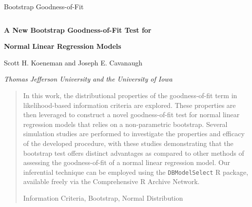 \documentclass[12pt]{article} %
\theoremstyle{definition}
\begin{document}


\renewcommand{\baselinestretch}{2}


{\hfill {\footnotesize\rm Bootstrap Goodness-of-Fit} \hfill}

\renewcommand{\thefootnote}{}
$\ $\par


\fontsize{12}{14pt plus.8pt minus .6pt}\selectfont \vspace{0.8pc}
\centerline{\large\bf A New Bootstrap Goodness-of-Fit Test for}
\vspace{2pt} 
\centerline{\large\bf Normal Linear Regression Models}
\vspace{.4cm} 
\centerline{Scott H. Koeneman and Joseph E. Cavanaugh} 
\vspace{.4cm} 
\centerline{\it Thomas Jefferson University and the University of Iowa}
 \vspace{.55cm} \fontsize{9}{11.5pt plus.8pt minus.6pt}\selectfont


\begin{quotation}
In this work, the distributional properties of the goodness-of-fit term in likelihood-based information criteria are explored. These properties are then leveraged
to construct a novel goodness-of-fit test for normal linear regression models that relies on a non-parametric bootstrap. Several simulation studies are performed to
investigate the properties and efficacy of the developed procedure, with these studies demonstrating that the bootstrap test offers distinct advantages as compared
to other methods of assessing the goodness-of-fit of a normal linear regression model. Our inferential technique can be employed using the \verb|DBModelSelect| R package,
available freely via the Comprehensive R Archive Network.


\vspace{9pt}
Information Criteria, Bootstrap, Normal Distribution
\par
\end{quotation}\par
\end{document}
